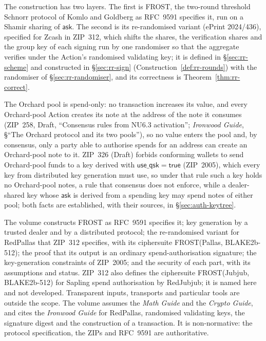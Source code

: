 \documentclass[11pt,a4paper]{article}
\theoremstyle{definition}
\newcommand{\ask}{\ensuremath{\mathsf{ask}}}
\begin{document}
The construction has two layers. The first is FROST, the two-round threshold
Schnorr protocol of Komlo and Goldberg as RFC~9591 specifies it, run on a
Shamir sharing of \(\ask\). The second is its re-randomised variant
(ePrint 2024/436), specified for Zcash in ZIP~312, which shifts the shares,
the verification shares and the group key of each signing run by one
randomiser so that the aggregate verifies under the Action's randomised
validating key; it is defined in \S\ref{sec:rr-scheme} and constructed in
\S\ref{sec:rr-sign} (Construction~\ref{def:rr-rounds}) with the randomiser
of \S\ref{sec:rr-randomiser}, and its correctness is
Theorem~\ref{thm:rr-correct}.

The Orchard pool is spend-only: no transaction increases its value, and every
Orchard-pool Action creates its note at the address of the note it consumes
(ZIP~258, Draft, ``Consensus rules from NU6.3 activation''; \emph{Ironwood
Guide}, \S``The Orchard protocol and its two pools''), so no value enters the
pool and, by consensus, only a party able to authorise spends for an address
can create an Orchard-pool note to it. ZIP~326 (Draft) forbids conforming
wallets to send Orchard-pool funds to a key derived with
\(\mathsf{use\_qsk} = \mathsf{true}\) (ZIP~2005), which every key from
distributed key generation must use, so under that rule such a key holds no
Orchard-pool notes, a rule that
consensus does not enforce, while a dealer-shared key whose \(\ask\) is
derived from a spending key may spend notes of either pool; both facts are
established, with their sources, in \S\ref{sec:auth-keytree}.

The volume constructs FROST as RFC~9591 specifies it; key generation by a
trusted dealer and by a distributed protocol; the re-randomised variant for
RedPallas that ZIP~312 specifies, with its ciphersuite FROST(Pallas,
BLAKE2b-512); the proof that its output is an ordinary spend-authorisation
signature; the key-generation constraints of ZIP~2005; and the security of
each part, with its assumptions and status. ZIP~312 also defines the
ciphersuite FROST(Jubjub, BLAKE2b-512) for Sapling spend authorisation by
RedJubjub; it is named here and not developed. Transparent inputs,
transports and particular tools are outside the scope. The volume assumes the
\emph{Math Guide} and the \emph{Crypto Guide}, and cites the \emph{Ironwood
Guide} for RedPallas, randomised validating keys, the signature digest and the
construction of a transaction. It is non-normative: the protocol
specification, the ZIPs and RFC~9591 are authoritative.
\end{document}
